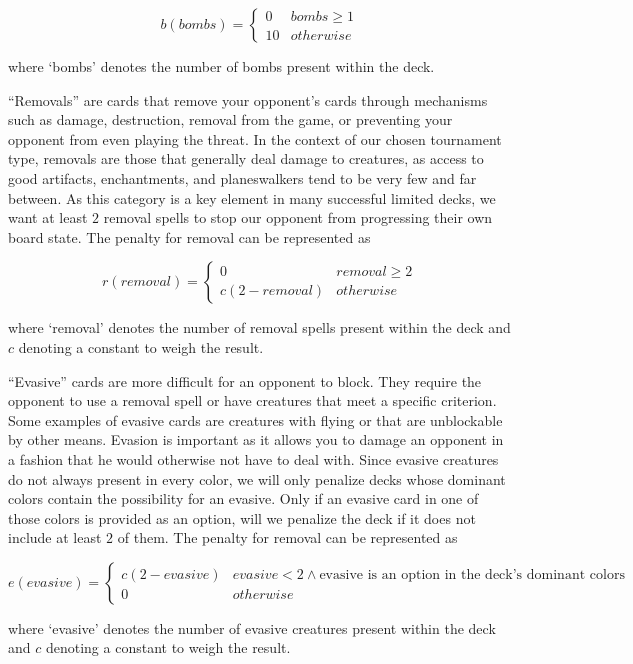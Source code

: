 \documentclass[12pt, letterpaper]{article}
\begin{document}
$$
b(bombs) = \begin{cases}
    0 & bombs \ge 1 \\
    10 & otherwise
\end{cases}
$$

where `bombs' denotes the number of bombs present within the deck.

\enquote{Removals} are
cards that remove your opponent's cards through mechanisms such as
damage, destruction, removal from the game, or preventing your opponent from even playing the threat.
In the context of our chosen tournament type,
removals are those that generally deal damage to creatures,
as access to good
artifacts, enchantments, and planeswalkers tend to be very few and far between.
As this category is a key element in many successful limited decks,
we want at least $ 2 $ removal spells to stop our opponent from progressing their own board state.
The penalty for removal can be represented as

$$
r(removal) = \begin{cases}
    0 & removal \ge 2 \\
    c(2-removal) & otherwise
\end{cases}
$$

where `removal' denotes the number of removal spells present within the deck
and $ c $ denoting a constant to weigh the result.

\enquote{Evasive} cards are
more difficult for an opponent to block.
They require the opponent to use a removal spell or have creatures that meet a specific criterion.
Some examples of evasive cards are creatures
with flying or that are unblockable by other means.
Evasion is important as it allows you to damage an opponent
in a fashion that he would otherwise not have to deal with.
Since evasive creatures do not always present in every color,
we will only penalize decks whose dominant colors contain the possibility for an evasive.
Only if an evasive card in one of those colors is provided as an option,
will we penalize the deck if it does not include at least $ 2 $ of them.
The penalty for removal can be represented as

$$
e(evasive) = \begin{cases}
    c(2 - evasive) & evasive < 2 \land \text{evasive is an option in the deck's dominant colors} \\
    0 & otherwise
\end{cases}
$$

where `evasive' denotes the number of evasive creatures present within the deck
and $ c $ denoting a constant to weigh the result.
\end{document}

